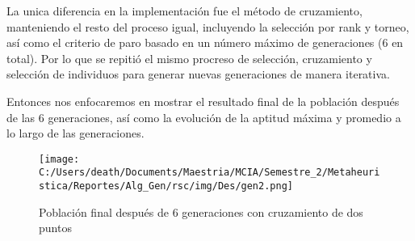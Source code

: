La unica diferencia en la implementación fue el método de cruzamiento, manteniendo el resto del proceso igual, incluyendo la selección por rank y torneo,
así como el criterio de paro basado en un número máximo de generaciones (6 en total). Por lo que se repitió el mismo procreso de selección, cruzamiento y selección de individuos
para generar nuevas generaciones de manera iterativa.

Entonces nos enfocaremos en mostrar el resultado final de la población después de las 6 generaciones, así como la evolución de la aptitud máxima y promedio 
a lo largo de las generaciones.

\begin{figure} [H]
    \centering
    \texttt{[image: C:/Users/death/Documents/Maestria/MCIA/Semestre\_2/Metaheuristica/Reportes/Alg\_Gen/rsc/img/Des/gen2.png]}
    \caption{Población final después de 6 generaciones con cruzamiento de dos puntos}\label{Pob_final_2ptos}
\end{figure}